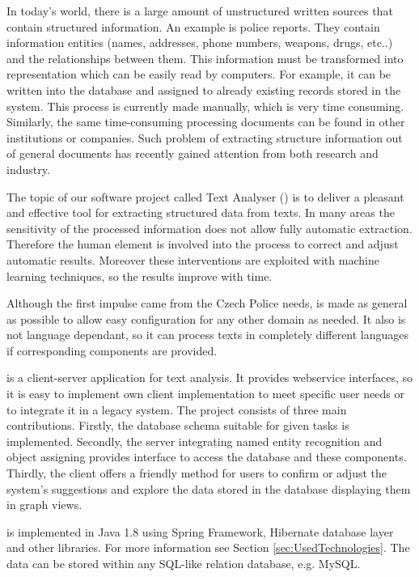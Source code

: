 
In today's world, there is a large amount of unstructured written sources that contain structured information. An example is police reports. They contain
information entities (names, addresses, phone numbers, weapons, drugs, etc..)
and the relationships between them. This information must be transformed into
representation which can be easily read by computers. For example, it can be
written into the database and assigned to already existing records stored in
the system. This process is currently made manually, which is very time 
consuming. Similarly, the same time-consuming processing documents can be found
in other institutions or companies. Such problem of extracting structure
information out of general documents has recently gained attention from both
research and industry.

The topic of our software project called Text Analyser (\textan{}) is to
deliver a pleasant and effective tool for extracting structured data from texts.
In many areas the sensitivity of the processed information does not allow fully
automatic extraction. Therefore the human element is involved into the process
to correct and adjust automatic results. Moreover these interventions are
exploited with machine learning techniques, so the results improve with time.

Although the first impulse came from the Czech Police needs, \textan{} is made
as general as possible to allow easy configuration for any other domain as
needed. It also is not language dependant, so it can process texts in completely
different languages if corresponding components are provided.

\textan{} is a client-server application for text analysis. It provides
webservice interfaces, so it is easy to implement own client implementation to
meet specific user needs or to integrate it in a legacy system. The project
consists of three main contributions. Firstly, the database schema suitable for
given tasks is implemented. Secondly, the server integrating named entity
recognition and object assigning provides interface to access the database and
these components. Thirdly, the client offers a friendly method for users to
confirm or adjust the system's suggestions and explore the data stored in the
database displaying them in graph views.

\textan{} is implemented in Java 1.8 using Spring Framework, Hibernate database
layer and other libraries. For more information see Section
\ref{sec:UsedTechnologies}. The data can be stored within any SQL-like relation
database, e.g. MySQL.
